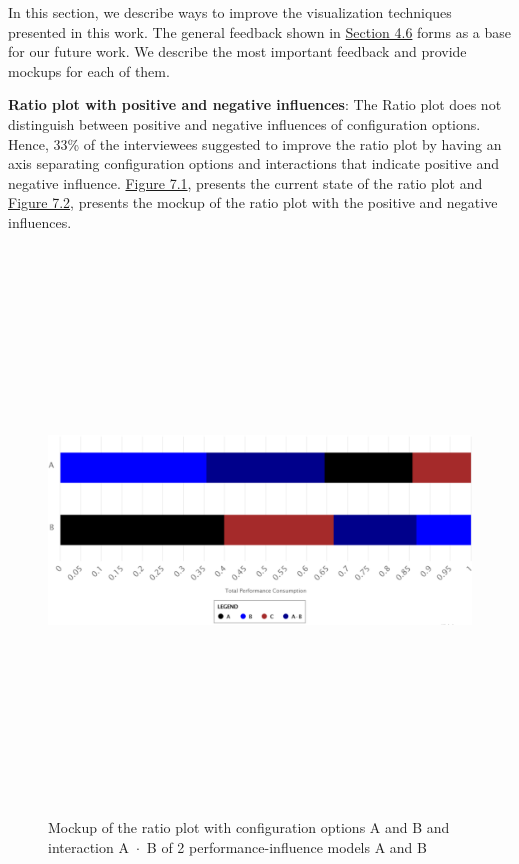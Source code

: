 \label{futurework}

In this section, we describe ways to improve the visualization techniques presented in this work. The general feedback shown in  \hyperref[sec:4.6]{Section 4.6} forms as a base for our future work.
We describe the most important feedback and provide mockups for each of them.


\begin{myindentpar}{0cm}
\textbf{Ratio plot with positive and negative influences}: The Ratio plot does not distinguish between positive and negative influences of configuration options. Hence, 33\% of the interviewees suggested to improve the ratio plot by having an axis separating configuration options and interactions that indicate positive and negative influence. \hyperref[posNegBefore]{Figure 7.1}, presents the current state of the ratio plot and \hyperref[posNegAfter]{Figure 7.2}, presents the mockup of the ratio plot with the positive and negative influences. 

\begin{figure}[ht]
\centering
\label{posNegBefore}
\includegraphics[width=15cm,height=15cm,keepaspectratio,]{pics/ratio_plot_positvie_negative_before.pdf}
\caption[Current state of the ratio plot]{Mockup of the ratio plot with configuration options A and B and interaction \mbox{A $\cdot$ B} of 2 performance-influence models A and B}
\end{figure}


\end{myindentpar}
